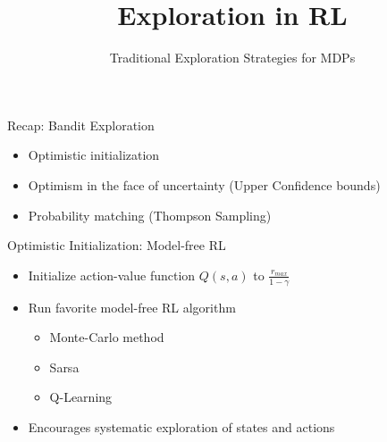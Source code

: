 \documentclass[aspectratio=169]{../latex_main/tntbeamer}  %
\title[RL: Exploration]{Exploration in RL}
\subtitle{Traditional Exploration Strategies for MDPs}
\begin{document}
	
	\maketitle

\begin{frame}[c]{Recap: Bandit Exploration}

\begin{itemize}
	\item Optimistic initialization
	\item Optimism in the face of uncertainty (Upper Confidence bounds)
	\item Probability matching (Thompson Sampling)
\end{itemize}

\end{frame}
\begin{frame}[c]{Optimistic Initialization: Model-free RL}
	
	\begin{itemize}
		\item Initialize action-value function $Q(s,a)$ to $\frac{r_{max}}{1-\gamma}$
		\item Run favorite model-free RL algorithm
		\begin{itemize}
			\item Monte-Carlo method
			\item Sarsa
			\item Q-Learning
		\end{itemize}
		\item Encourages systematic exploration of states and actions
	\end{itemize}
	
\end{frame}
\end{document}
